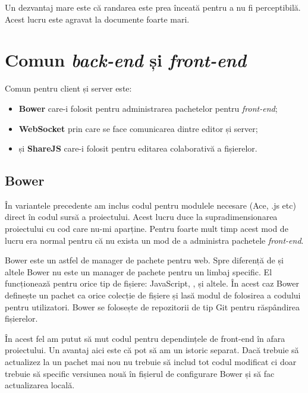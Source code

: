 \documentclass[a4wide,12pt]{report}
\newcommand{\eng}[1]{\emph{#1}} %
\newcommand{\acr}[1]{{\textsmaller[1]{\textsc{#1}}}} %
\begin{document}
Un dezvantaj mare este că randarea este prea înceată pentru a nu fi
perceptibilă. Acest lucru este agravat la documente foarte mari.

\section{Comun \eng{back-end} și \eng{front-end}}

Comun pentru client și server este:

\begin{itemize}

\item \textbf{Bower} care-i folosit pentru administrarea pachetelor pentru
\eng{front-end};

\item \textbf{WebSocket} prin care se face comunicarea dintre editor și server;

\item și \textbf{ShareJS} care-i folosit pentru editarea colaborativă a
fișierelor.

\end{itemize}

\subsection{Bower}
\label{bowersub}

În variantele precedente am inclus codul pentru modulele necesare (Ace,
\acr{PDF}.js etc) direct în codul sursă a proiectului. Acest lucru duce la
supradimensionarea proiectului cu cod care nu-mi aparține. Pentru foarte mult
timp acest mod de lucru era normal pentru că nu exista un mod de a administra
pachetele \eng{front-end}.

Bower este un astfel de manager de pachete pentru web. Spre diferență de
\acr{NPM} și altele Bower nu este un manager de pachete pentru un limbaj
specific. El funcționează pentru orice tip de fișiere: JavaScript, \acr{HTML},
\acr{CSS} și altele. În acest caz Bower definește un pachet ca orice colecție de
fișiere și lasă modul de folosirea a codului pentru utilizatori. Bower se
folosește de repozitorii de tip Git pentru răspândirea fișierelor.

În acest fel am putut să mut codul pentru dependințele de front-end în afara
proiectului. Un avantaj aici este că pot să am un istoric separat. Dacă trebuie
să actualizez la un pachet mai nou nu trebuie să includ tot codul modificat ci
doar trebuie să specific versiunea nouă în fișierul de configurare Bower și să
fac actualizarea locală.
\end{document}
